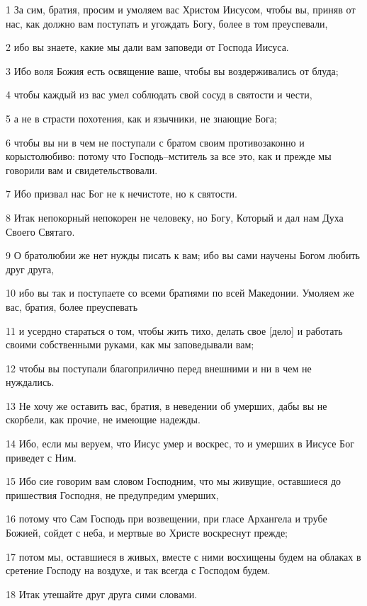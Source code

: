\par 1 За сим, братия, просим и умоляем вас Христом Иисусом, чтобы вы, приняв от нас, как должно вам поступать и угождать Богу, более в том преуспевали,
\par 2 ибо вы знаете, какие мы дали вам заповеди от Господа Иисуса.
\par 3 Ибо воля Божия есть освящение ваше, чтобы вы воздерживались от блуда;
\par 4 чтобы каждый из вас умел соблюдать свой сосуд в святости и чести,
\par 5 а не в страсти похотения, как и язычники, не знающие Бога;
\par 6 чтобы вы ни в чем не поступали с братом своим противозаконно и корыстолюбиво: потому что Господь--мститель за все это, как и прежде мы говорили вам и свидетельствовали.
\par 7 Ибо призвал нас Бог не к нечистоте, но к святости.
\par 8 Итак непокорный непокорен не человеку, но Богу, Который и дал нам Духа Своего Святаго.
\par 9 О братолюбии же нет нужды писать к вам; ибо вы сами научены Богом любить друг друга,
\par 10 ибо вы так и поступаете со всеми братиями по всей Македонии. Умоляем же вас, братия, более преуспевать
\par 11 и усердно стараться о том, чтобы жить тихо, делать свое [дело] и работать своими собственными руками, как мы заповедывали вам;
\par 12 чтобы вы поступали благоприлично перед внешними и ни в чем не нуждались.
\par 13 Не хочу же оставить вас, братия, в неведении об умерших, дабы вы не скорбели, как прочие, не имеющие надежды.
\par 14 Ибо, если мы веруем, что Иисус умер и воскрес, то и умерших в Иисусе Бог приведет с Ним.
\par 15 Ибо сие говорим вам словом Господним, что мы живущие, оставшиеся до пришествия Господня, не предупредим умерших,
\par 16 потому что Сам Господь при возвещении, при гласе Архангела и трубе Божией, сойдет с неба, и мертвые во Христе воскреснут прежде;
\par 17 потом мы, оставшиеся в живых, вместе с ними восхищены будем на облаках в сретение Господу на воздухе, и так всегда с Господом будем.
\par 18 Итак утешайте друг друга сими словами.

